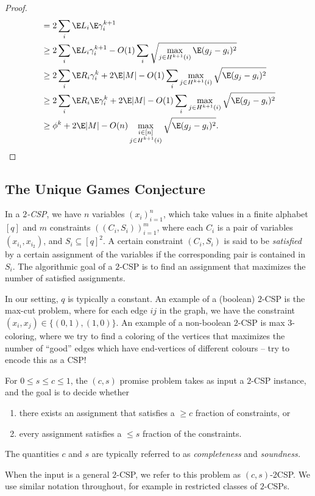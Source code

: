 \begin{proof}
\begin{align*}
				&= 2 \sum_i \E L_i \E \gamma_i^{k+1} \\
				&\ge 2 \sum_i \E L_i \gamma_i^{k+1} - O(1) \sum_i \sqrt{\max_{j \in H^{k+1}(i)} \E (g_j - g_i)^2} \\
				&\ge 2 \sum_i \E R_i \gamma_i^k + 2 \E |M| - O(1) \sum_i \max_{j \in H^{k+1}(i)} \sqrt{\E (g_j - g_i)^2} \\
				&\ge 2 \sum_i \E R_i \E \gamma_i^k + 2 \E |M| - O(1) \sum_i \max_{j \in H^{k+1}(i)} \sqrt{ \E (g_j - g_i)^2} \\
				&\ge \phi^{k} + 2 \E |M| - O(n) \max_{\substack{i \in [n] \\ j \in H^{k+1}(i)}} \sqrt{\E (g_j - g_i)^2}. \qedhere
		\end{align*}
	\end{proof}

\subsection{The Unique Games Conjecture}

	\begin{fdef}
		In a \emph{$2$-CSP}, we have $n$ variables $(x_i)_{i=1}^n$, which take values in a finite alphabet $[q]$ and $m$ constraints $( (C_i,S_i) )_{i=1}^m$, where each $C_i$ is a pair of variables $(x_{i_1},x_{i_2})$, and $S_i \subseteq [q]^2$. A certain constraint $(C_i,S_i)$ is said to be \emph{satisfied} by a certain assignment of the variables if the corresponding pair is contained in $S_i$. The algorithmic goal of a $2$-CSP is to find an assignment that maximizes the number of satisfied assignments.
	\end{fdef}
	In our setting, $q$ is typically a constant. An example of a (boolean) $2$-CSP is the max-cut problem, where for each edge $ij$ in the graph, we have the constraint $(x_i,x_j) \in \{(0,1),(1,0)\}$. An example of a non-boolean $2$-CSP is max $3$-coloring, where we try to find a coloring of the vertices that maximizes the number of ``good'' edges which have end-vertices of different colours -- try to encode this as a CSP!

	\begin{fdef}
		For $0 \le s \le c \le 1$, the $(c,s)$ promise problem takes as input a $2$-CSP instance, and the goal is to decide whether
		\begin{enumerate}
			\item there exists an assignment that satisfies a $\ge c$ fraction of constraints, or
			\item every assignment satisfies a $\le s$ fraction of the constraints.
		\end{enumerate}
		The quantities $c$ and $s$ are typically referred to as \emph{completeness} and \emph{soundness.}
	\end{fdef}
	When the input is a general $2$-CSP, we refer to this problem as $(c,s)$-2CSP. We use similar notation throughout, for example in restricted classes of $2$-CSPs.

